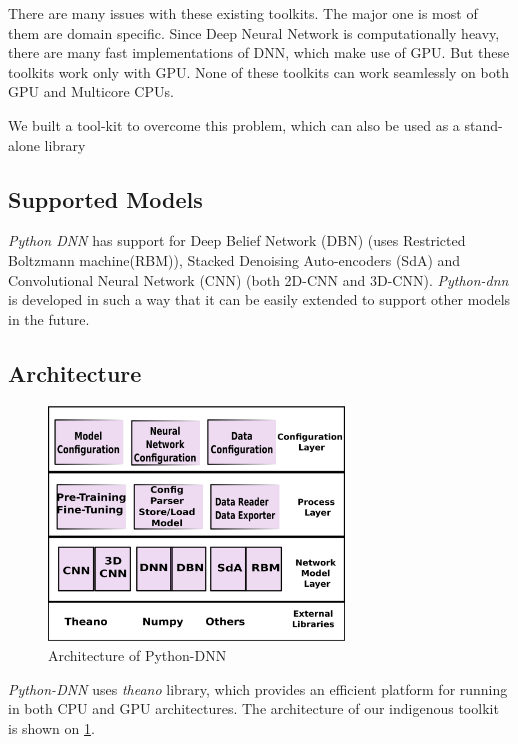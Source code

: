 There are many issues with these existing toolkits. The major one is most of them are domain specific. Since Deep Neural Network is computationally heavy, there are many fast implementations of DNN, which make use of GPU. But these toolkits work only with GPU. None of these toolkits can work seamlessly on both GPU and Multicore CPUs. 

We built a tool-kit to overcome this problem, which can also be used as a stand-alone library


\subsection{Supported Models}
\label{sec:python-dnnModels}
\textit{Python DNN}  has support  for Deep Belief Network (DBN) \cite{hinton2002training} (uses Restricted Boltzmann machine(RBM)), Stacked Denoising Auto-encoders (SdA) \cite{vincent2010stacked} and Convolutional Neural Network (CNN) \cite{lecun1998gradient} (both 2D-CNN and 3D-CNN). \textit{Python-dnn} is developed in such a way that it can be easily extended to support other models in the future.

\subsection{Architecture}

\begin{figure}[ht]
\centering
\includegraphics[width=0.7\textwidth]{./imgs/Python-DNNArch.eps}
\caption{Architecture of Python-DNN}
\label{fig:pydnn-arch}
\end{figure}

\textit{Python-DNN} uses \emph{theano} library, which provides an efficient platform for running in both CPU and GPU architectures. The architecture of our indigenous toolkit is shown on \ref{fig:pydnn-arch}. 

